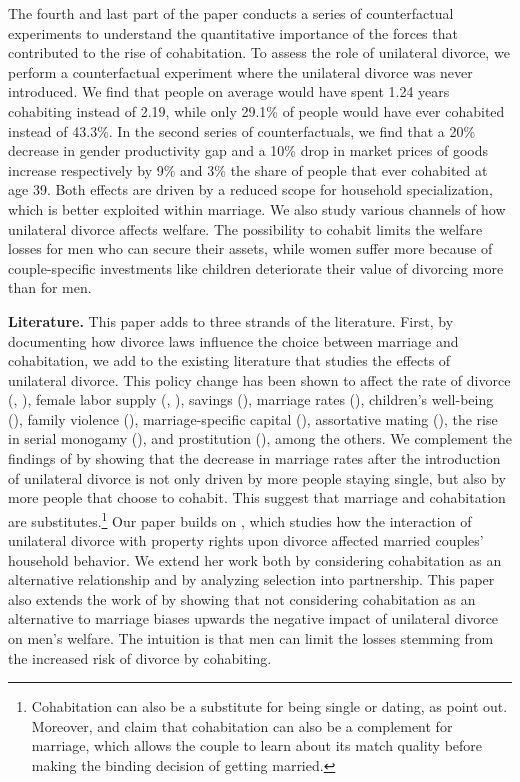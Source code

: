 \documentclass[12pt]{article}
\numberwithin{table}{section}
\begin{document}
The fourth and last part of the paper conducts a series of counterfactual experiments to understand the quantitative importance of the forces that contributed to the rise of cohabitation. To assess the role of unilateral divorce, we perform a counterfactual experiment where the unilateral divorce was never introduced. We find that people on average would have spent 1.24 years cohabiting instead of 2.19, while only 29.1\% of people would have ever cohabited instead of 43.3\%. In the second series of counterfactuals, we find that a 20\% decrease in gender productivity gap and a 10\% drop in market prices of goods increase respectively by 9\% and 3\% the share of people that ever cohabited at age 39. Both effects are driven by a reduced scope for household specialization, which is better exploited within marriage. We also study various channels of how unilateral divorce affects welfare. The possibility to cohabit limits the welfare losses for men who can secure their assets, while women suffer more because of couple-specific investments like children deteriorate their value of divorcing more than for men.

\textbf{Literature.} This paper adds to three strands of the literature. First, by documenting how divorce laws influence the choice between marriage and cohabitation, we add to the existing literature that studies the effects of unilateral divorce. This policy change has been shown to affect the rate of divorce (\citealp{friedberg1998}, \citealp{wolfers2006}), female labor supply (\citealp{stevenson2008}, \citealp{voena2015}), savings (\citealp{voena2015}), marriage rates (\citealp{rasul2003,rasul2006}), children's well-being (\citealp{gruber2004}), family violence (\citealp{stevenson2006}), marriage-specific capital (\citealp{stevenson2007}), assortative mating (\citealp{reynoso2019}), the rise in serial monogamy (\citealp{de2015}),  and prostitution (\citealp{ciacci2017}), among the others. We complement the findings of \cite{rasul2003,rasul2006} by showing that the decrease in marriage rates after the introduction of unilateral divorce is not only driven by more people staying single, but also by more people that choose to cohabit. This suggest that marriage and cohabitation are substitutes.\footnote{Cohabitation can also be a substitute for being single or dating, as \cite{rindfuss1990} point out. Moreover, \cite{blasutto2020} and \cite{brien2006} claim that cohabitation can also be a complement for marriage, which allows the couple to learn about its match quality before making the binding decision of getting married.} Our paper builds on \cite{voena2015},  which studies how the interaction of unilateral divorce with property rights upon divorce affected married couples' household behavior. We extend her work both by considering cohabitation as an alternative relationship and by analyzing selection into partnership. This paper also extends the work of \cite{fernandez2017} by showing that not considering cohabitation as an alternative to marriage biases upwards the negative impact of unilateral divorce on men's welfare. The intuition is that men can limit the losses stemming from the increased risk of divorce by cohabiting.
\end{document}

